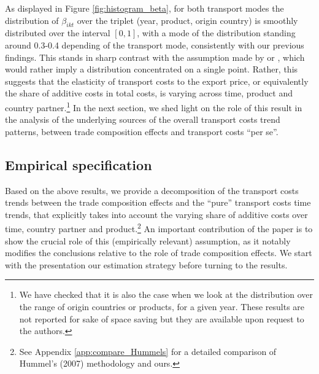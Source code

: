 \documentclass[a4paper,11pt]{article}
\begin{document}
As displayed in Figure \ref{fig:histogram_beta}, for both transport modes the distribution of $\beta_{ikt}$ over the triplet (year, product, origin country) is smoothly distributed over the interval $[0,1]$, with a mode of the distribution standing around 0.3-0.4 depending of the transport mode, consistently with our previous findings. This stands in sharp contrast with the assumption made by  \cite{hummels_skiba} or \cite{hummels2007}, which would rather imply a distribution concentrated on a single point. Rather, this suggests that the elasticity of transport costs to the export price, or equivalently the share of additive costs in total costs, is varying across time, product and country partner.\footnote{We have checked that it is also the case when we look at the distribution over the range of origin countries or products, for a given year. These results are not reported for sake of space saving but they are available upon request to the authors.} In the next section, we shed light on the role of this result in the analysis of the underlying sources of the overall transport costs trend patterns, between trade composition effects and transport costs ``per se''.

\subsection{Empirical specification}

Based on the above results, we provide a decomposition of the transport costs trends between the trade composition effects and the ``pure'' transport costs time trends, that explicitly takes into account the varying share of additive costs over time, country partner and product.\footnote{See Appendix \ref{app:compare_Hummels} for a detailed comparison of Hummel's (2007) methodology and ours.} An important contribution of the paper is to show the crucial role of this (empirically relevant) assumption, as it notably modifies the conclusions relative to the role of trade composition effects. We start with the presentation our estimation strategy before turning to the results.\smallskip
\end{document}
